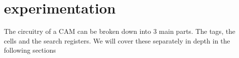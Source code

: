 \section{experimentation}
The circuitry of a CAM can be broken down into 3 main parts. The tags, the cells and the search registers. 
We will cover these separately in depth in the following sections

